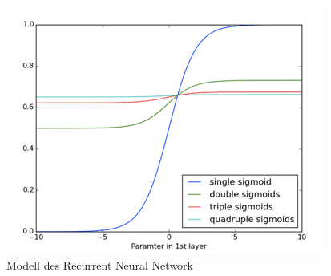 \begin{figure}[h!]
	\centering
	\includegraphics[width=0.9\linewidth]{images/vanishing_gradient}
	\caption{Modell des Recurrent Neural Network \cite{deeplearning4j}} %
	\label{fig:topology}
\end{figure} 


